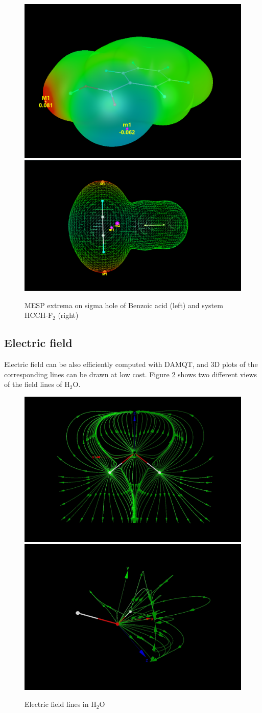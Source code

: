 \documentclass[10pt]{article}
\begin{document}
\vspace*{5mm}
\begin{figure}[H]
\begin{center}
\hspace*{5mm}
\includegraphics[width=.31\linewidth]{damqt320_benzoic_sgh.png}
\hspace*{5mm}
\includegraphics[width=.365\linewidth]{damqt320_sg_hole_mesp_extrema.png}
\end{center}
\caption[MESP extrema on sigma hole]{ MESP extrema on sigma hole of Benzoic acid (left)
and system HCCH-F$_2$ (right)
\label{fig:6_6_1}}
\end{figure}


\subsection{Electric field \label{sec:6.7} }

Electric field can be also efficiently computed with DAMQT, and 3D plots of
the corresponding lines can be drawn at low cost. Figure \ref{fig:6_7_1} shows
two different views of the field lines of H$_2$O. 

\begin{figure}[H]
\begin{center}
\hspace*{-2mm}
\includegraphics[width=.31\linewidth]{H2O-field-1.png}
\hspace*{5mm}
\includegraphics[width=.31\linewidth]{H2O-field-2.png}
\end{center}
\caption{ Electric field lines in H$_2$O
\label{fig:6_7_1}}
\end{figure}
\end{document}
